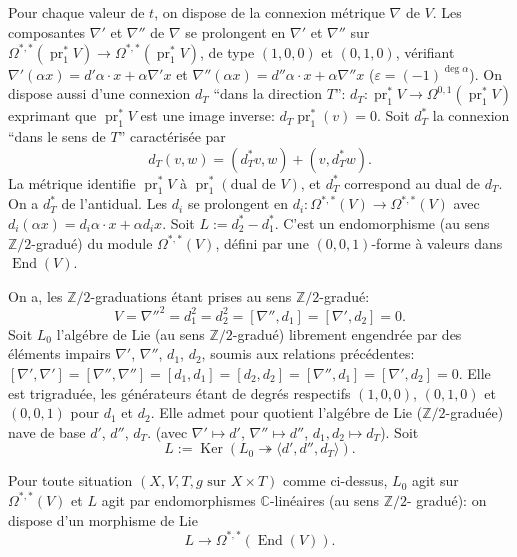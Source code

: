 \documentclass[12pt,a4paper]{article}
\theoremstyle{plain}
\theoremstyle{definition}
\DeclareMathOperator{\Ker}{Ker}
\DeclareMathOperator{\End}{End}
\DeclareMathOperator{\pr}{pr}
\newcommand{\ZZ}{\mathbb{Z}}
\newcommand{\CC}{\mathbb{C}}
\begin{document}
\subsection{}

Pour chaque valeur de $t$, on dispose de la connexion m\'etrique $\nabla$ de $V$.
Les composantes $\nabla'$ et $\nabla''$ de $\nabla$ se prolongent en $\nabla'$ et $\nabla''$ sur $\Omega^{*,*}(\pr_1^* V) \to
\Omega^{*,*}(\pr_1^* V)$, de type $(1,0,0)$ et $(0,1,0)$, v\'erifiant $\nabla'(\alpha x) = d'\alpha \cdot x + \alpha \nabla' x$
et $\nabla''(\alpha x) = d''\alpha \cdot x + \alpha \nabla'' x$ ($\varepsilon = (-1)^{\deg \alpha}$). On dispose aussi d'une connexion
$d_T$ ``dans la direction $T$'': $d_T: \pr_1^* V \to \Omega^{0,1}(\pr_1^* V)$ exprimant que $\pr_1^* V$ est une image
inverse: $d_T \pr_1^*(v) = 0$. Soit $d_T^*$ la connexion ``dans le sens de $T$'' caract\'eris\'ee
par
\[
d_T(v, w) = (d_T^* v, w) + (v, d_T^* w) .
\]
La m\'etrique identifie $\pr_1^* V$ \`a $\pr_1^*(\text{dual de } V)$, et $d_T^*$ correspond au
dual de $d_T$. On a $d_T^*$ de l'antidual. Les $d_i$ se prolongent en $d_i: \Omega^{*,*}(V) \to \Omega^{*,*}(V)$ avec
$d_i(\alpha x) = d_i \alpha \cdot x + \alpha d_i x$. Soit $L := d_2^* - d_1^*$. C'est un endomorphisme (au sens
$\ZZ/2$-\-gradu\'e) du module $\Omega^{*,*}(V)$, d\'efini par une $(0,0,1)$-forme \`a valeurs
dans $\End(V)$.

On a, les $\ZZ/2$-graduations \'etant prises au sens $\ZZ/2$-gradu\'e:
\[
V = \nabla''^2 = d_1^2 = d_2^2 = [\nabla'', d_1] = [\nabla', d_2] = 0 .
\]
Soit $L_0$ l'alg\'ebre de Lie (au sens $\ZZ/2$-gradu\'e) librement engendr\'ee par des \'el\'ements
impairs $\nabla'$, $\nabla''$, $d_1$, $d_2$, soumis aux relations pr\'ec\'edentes: $[\nabla', \nabla'] = [\nabla'',
\nabla''] = [d_1, d_1] = [d_2, d_2] = [\nabla'', d_1] = [\nabla', d_2] = 0$. Elle est trigradu\'ee,
les g\'en\'erateurs \'etant de degr\'es respectifs $(1,0,0)$, $(0,1,0)$ et $(0,0,1)$ pour $d_1$
et $d_2$. Elle admet pour quotient l'alg\'ebre de Lie ($\ZZ/2$-gradu\'ee) nave
de base $d'$, $d''$, $d_T$. (avec $\nabla' \mapsto d'$, $\nabla'' \mapsto d''$, $d_1, d_2 \mapsto d_T$). Soit
\[
L := \Ker(L_0 \twoheadrightarrow \langle d', d'', d_T \rangle) .
\]

Pour toute situation $(X, V, T, g \text{ sur } X \times T)$ comme ci-dessus, $L_0$
agit sur $\Omega^{*,*}(V)$ et $L$ agit par endomorphismes $\CC$-lin\'eaires (au sens $\ZZ/2$-
gradu\'e): on dispose d'un morphisme de Lie
\[
L \longrightarrow \Omega^{*,*}(\End(V)) .
\]
\end{document}
